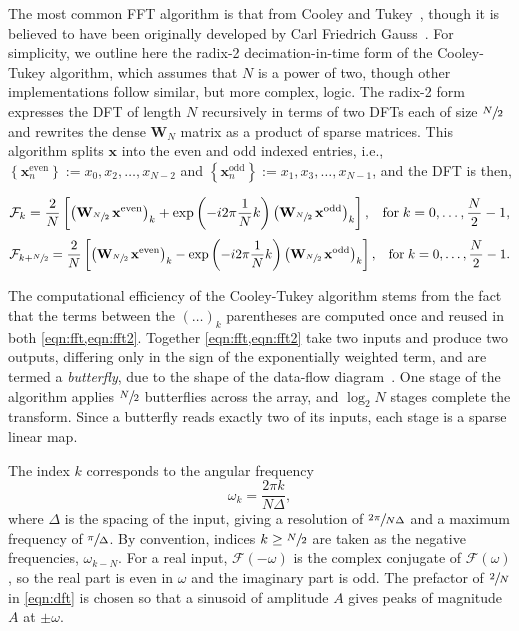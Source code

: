 \documentclass[reprint,
               superscriptaddress,
               nobibnotes,
               amsmath,
               amssymb,
               aps,
               hidelinks, 
               pre]{revtex4-2}
\begin{document}
The most common FFT algorithm is that from Cooley and Tukey~\cite{Cooley1965}, though it is believed to have been originally developed by Carl Friedrich Gauss~\cite{Heideman1984}. 
For simplicity, we outline here the radix-2 decimation-in-time form of the Cooley-Tukey algorithm, which assumes that $N$ is a power of two, though other implementations follow similar, but more complex, logic. 
The radix-2 form expresses the DFT of length $N$ recursively in terms of two DFTs each of size $\sfrac{N}{2}$ and rewrites the dense $\mathbf{W}_N$ matrix as a product of sparse matrices. 
This algorithm splits $\mathbf{x}$ into the even and odd indexed entries, i.e., $\left\{\mathbf{x}^{\textrm{even}}_{n}\right\} := x_0, x_2, \ldots, x_{N-2}$ and $\left\{\mathbf{x}^{\textrm{odd}}_{n}\right\} := x_1, x_3, \ldots, x_{N-1}$, and the DFT is then, 
%
\begin{widetext}
    \begin{equation}
        \mathcal{F}_k = \frac{2}{N}\left[\left(\mathbf{W}_{\sfrac{N}{2}}\,\mathbf{x}^{\textrm{even}}\right)_k + \exp{\left(-i2\pi\frac{1}{N}k\right)} \left(\mathbf{W}_{\sfrac{N}{2}}\,\mathbf{x}^{\textrm{odd}}\right)_k\right],\;\;\;\textrm{for}\;k=0,\ldots,\frac{N}{2}-1,
    \label{eqn:fft}
    \end{equation}
    \begin{equation}
        \mathcal{F}_{k + \sfrac{N}{2}} = \frac{2}{N}\left[\left(\mathbf{W}_{\sfrac{N}{2}}\,\mathbf{x}^{\textrm{even}}\right)_k - \exp{\left(-i2\pi\frac{1}{N}k\right)} \left(\mathbf{W}_{\sfrac{N}{2}}\,\mathbf{x}^{\textrm{odd}}\right)_k\right],\;\;\;\textrm{for}\;k=0,\ldots,\frac{N}{2}-1.
    \label{eqn:fft2}
    \end{equation}
\end{widetext}
%
The computational efficiency of the Cooley-Tukey algorithm stems from the fact that the terms between the $\left(\ldots\right)_k$ parentheses are computed once and reused in both \cref{eqn:fft,eqn:fft2}. 
Together \cref{eqn:fft,eqn:fft2} take two inputs and produce two outputs, differing only in the sign of the exponentially weighted term, and are termed a \emph{butterfly}, due to the shape of the data-flow diagram~\cite{Gentleman1966}. 
One stage of the algorithm applies $\sfrac{N}{2}$ butterflies across the array, and $\log_2 N$ stages complete the transform. 
Since a butterfly reads exactly two of its inputs, each stage is a sparse linear map. 

The index $k$ corresponds to the angular frequency
%
\begin{equation}
    \omega_k = \frac{2\pi k}{N\Delta},
    \label{eqn:freq}
\end{equation}
%
where $\Delta$ is the spacing of the input, giving a resolution of $\sfrac{2\pi}{N\Delta}$ and a maximum frequency of $\sfrac{\pi}{\Delta}$. 
By convention, indices $k \geq \sfrac{N}{2}$ are taken as the negative frequencies, $\omega_{k-N}$. 
For a real input, $\mathcal{F}(-\omega)$ is the complex conjugate of $\mathcal{F}(\omega)$, so the real part is even in $\omega$ and the imaginary part is odd. 
The prefactor of $\sfrac{2}{N}$ in \cref{eqn:dft} is chosen so that a sinusoid of amplitude $A$ gives peaks of magnitude $A$ at $\pm\omega$. 
\end{document}
